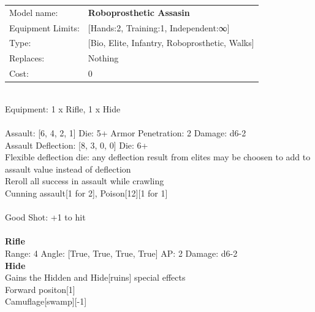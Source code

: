 {\noindent
\begin{tabular}{ll}
Model name: &{\bf Roboprosthetic Assasin } \\
Equipment Limits: &[Hands:2, Training:1, Independent:∞] \\
Type: &[Bio, Elite, Infantry, Roboprosthetic, Walks] \\
Replaces: &Nothing \\
Cost: & 0\\
\end{tabular}
\ \\
Equipment: 1 x Rifle, 1 x Hide \\
\ \\
Assault: [6, 4, 2, 1] Die: 5+ Armor Penetration: 2 Damage: d6-2 \\
Assault Deflection: [8, 3, 0, 0] Die: 6+\\
\indent Flexible deflection die: any deflection result from elites may be choosen to add to assault value instead of deflection\\ 
Reroll all success in assault while crawling\\ 
Cunning assault[1 for 2], Poison[12][1 for 1]\\ 
 
\ \\
Good Shot: +1 to hit\\ 

\ \\
{\bf Rifle } \\



Range: 4  Angle: [True, True, True, True] AP: 2 Damage: d6-2 \\




{\bf Hide } \\

Gains the Hidden and Hide[ruins] special effects\\ 
Forward positon[1]\\ 
Camuflage[swamp][-1]\\ 





 
\ \\













\clearpage

}
